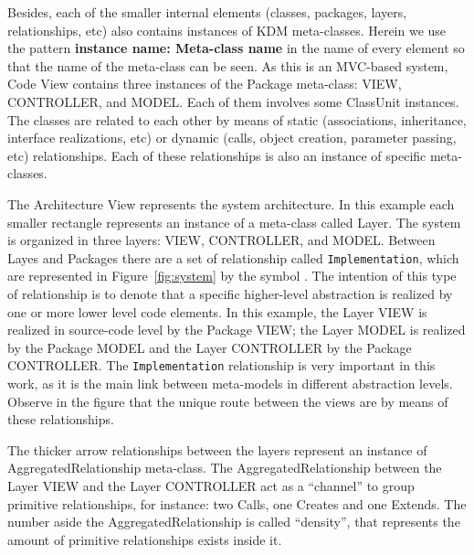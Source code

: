 Besides, each of the smaller internal elements (classes, packages, layers, relationships, etc) also contains instances of KDM meta-classes. Herein we use the pattern \textbf{instance name: Meta-class name} in the name of every element so that the name of the meta-class can be seen. As this is an MVC-based system, Code View contains three instances of the Package meta-class: VIEW, CONTROLLER, and MODEL. Each of them involves some ClassUnit instances. The classes are related to each other by means of static (associations, inheritance, interface realizations, etc) or dynamic (calls, object creation, parameter passing, etc) relationships. Each of these relationships is also an instance of specific meta-classes. 

The Architecture View represents the system architecture. In this example each smaller rectangle represents an instance of a meta-class called Layer. The system is organized in three layers:  VIEW, CONTROLLER, and MODEL. Between Layes and Packages there are a set of relationship called \texttt{Implementation}, which are represented in Figure~\ref{fig:system} by the symbol \foobarMeu. The intention of this type of relationship is to denote that a specific higher-level abstraction is realized by one or more lower level code elements. In this example, the Layer VIEW is realized in source-code level by the Package VIEW; the Layer MODEL is realized by the Package MODEL and the Layer CONTROLLER by the Package CONTROLLER. The \texttt{Implementation} relationship is very important in this work, as it is the main link between meta-models in different abstraction levels. Observe in the figure that the unique route between the views are by means of these relationships.
%

The thicker arrow relationships between the layers represent an instance of AggregatedRelationship meta-class. The AggregatedRelationship between the Layer VIEW and the Layer CONTROLLER act as a ``channel'' to group primitive relationships, for instance: two Calls, one Creates and one Extends. The number aside the AggregatedRelationship is called ``density'', that represents the amount of primitive relationships exists inside it.

